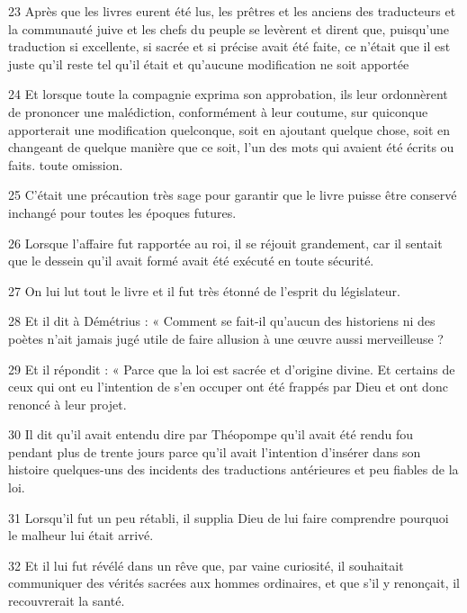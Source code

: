 \par 23 Après que les livres eurent été lus, les prêtres et les anciens des traducteurs et la communauté juive et les chefs du peuple se levèrent et dirent que, puisqu'une traduction si excellente, si sacrée et si précise avait été faite, ce n'était que il est juste qu'il reste tel qu'il était et qu'aucune modification ne soit apportée

\par 24 Et lorsque toute la compagnie exprima son approbation, ils leur ordonnèrent de prononcer une malédiction, conformément à leur coutume, sur quiconque apporterait une modification quelconque, soit en ajoutant quelque chose, soit en changeant de quelque manière que ce soit, l'un des mots qui avaient été écrits ou faits. toute omission.

\par 25 C'était une précaution très sage pour garantir que le livre puisse être conservé inchangé pour toutes les époques futures.

\par 26 Lorsque l'affaire fut rapportée au roi, il se réjouit grandement, car il sentait que le dessein qu'il avait formé avait été exécuté en toute sécurité.

\par 27 On lui lut tout le livre et il fut très étonné de l'esprit du législateur.

\par 28 Et il dit à Démétrius : « Comment se fait-il qu'aucun des historiens ni des poètes n'ait jamais jugé utile de faire allusion à une œuvre aussi merveilleuse ?

\par 29 Et il répondit : « Parce que la loi est sacrée et d'origine divine. Et certains de ceux qui ont eu l'intention de s'en occuper ont été frappés par Dieu et ont donc renoncé à leur projet.

\par 30 Il dit qu'il avait entendu dire par Théopompe qu'il avait été rendu fou pendant plus de trente jours parce qu'il avait l'intention d'insérer dans son histoire quelques-uns des incidents des traductions antérieures et peu fiables de la loi.

\par 31 Lorsqu'il fut un peu rétabli, il supplia Dieu de lui faire comprendre pourquoi le malheur lui était arrivé.

\par 32 Et il lui fut révélé dans un rêve que, par vaine curiosité, il souhaitait communiquer des vérités sacrées aux hommes ordinaires, et que s'il y renonçait, il recouvrerait la santé.

